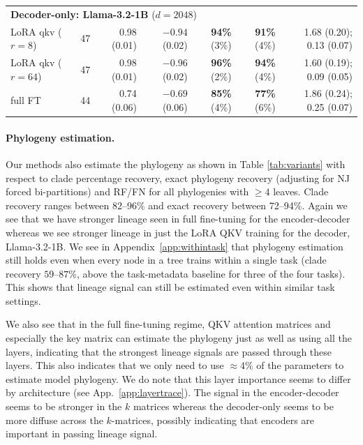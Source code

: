 \documentclass{article}
\theoremstyle{definition}
\theoremstyle{plain}
\begin{document}
\begin{table}[t]
\begin{center}
\begin{tabular}{lrrrrrr}
\multicolumn{7}{l}{\textbf{Decoder-only: Llama-3.2-1B} ($d=2048$)} \\
\quad LoRA qkv ($r{=}8$)  & 47 & 0.98 (0.01) & $-0.94$ (0.02) & \textbf{94\%} (3\%) & \textbf{91\%} (4\%) & 1.68 (0.20); 0.13 (0.07) \\
\quad LoRA qkv ($r{=}64$) & 47 & 0.98 (0.01) & $-0.96$ (0.02) & \textbf{96\%} (2\%) & \textbf{94\%} (4\%) & 1.60 (0.19); 0.09 (0.05) \\
\quad full FT             & 44 & 0.74 (0.06) & $-0.69$ (0.06) & \textbf{85\%} (4\%) & \textbf{77\%} (6\%) & 1.86 (0.24); 0.25 (0.07) \\
\bottomrule
\end{tabular}
\end{center}
\end{table}
 


\paragraph{Phylogeny estimation.}
\label{sec:results:weighttree}
Our methods also estimate the phylogeny as shown in Table \ref{tab:variants} with respect to clade percentage recovery, exact phylogeny recovery (adjusting for NJ forced bi-partitions) and RF/FN for all phylogenies with $\ge 4$ leaves. Clade recovery ranges between 82--96\% and exact recovery between 72--94\%.  Again we see that we have stronger lineage seen in full fine-tuning for the encoder-decoder whereas we see stronger lineage in just the LoRA QKV training for the decoder, Llama-3.2-1B.  We see in Appendix~\ref{app:withintask} that phylogeny estimation still holds even when every node in a tree trains within a single task (clade recovery $59$--$87\%$, above the task-metadata baseline for three of the four tasks). This shows that lineage signal can still be estimated even within similar task settings.

We also see that in the full fine-tuning regime, QKV attention matrices and especially the key matrix can estimate the phylogeny just as well as using all the layers, indicating that the strongest lineage signals are passed through these layers.  This also indicates that we only need to use $\approx$4\% of the parameters to estimate model phylogeny.  We do note that this layer importance seems to differ by architecture (see App.~\ref{app:layertrace}).  The signal in the encoder-decoder seems to be stronger in the $k$ matrices whereas the decoder-only seems to be more diffuse across the $k$-matrices, possibly indicating that encoders are important in passing lineage signal.
\end{document}
